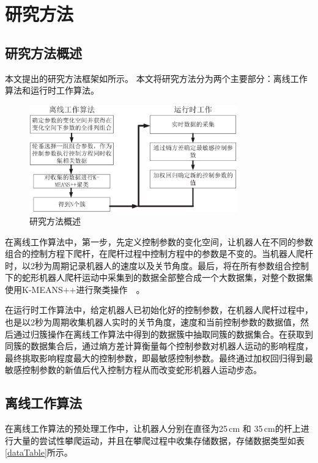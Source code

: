 \chapter{研究方法}
\label{cha:method}

\section{研究方法概述}
本文提出的研究方法框架如所示。 本文将研究方法分为两个主要部分：离线工作算法和运行时工作算法。
\begin{figure}[h]
	\centering
	\includegraphics[width=0.8\textwidth]{figure/chap03/step.eps}
	\caption{研究方法概述}
	\label{fig:stepMap}
\end{figure}

在离线工作算法中，第一步，先定义控制参数的变化空间，让机器人在不同的参数组合的控制方程下爬杆，在爬杆过程中控制方程中的参数是不变的。当机器人爬杆时，以2秒为周期记录机器人的速度以及关节角度。最后，将在所有参数组合控制下的蛇形机器人爬杆运动中采集到的数据全部整合成一个大数据集，对整个数据集使用K-MEANS++进行聚类操作~\cite{Cluseter_ICT}~\cite{KmeansAndDeepLearning}。

在运行时工作算法中，给定机器人已初始化好的控制参数，在机器人爬杆过程中，也是以2秒为周期收集机器人实时的关节角度，速度和当前控制参数的数据值，然后通过归簇操作在离线工作算法中得到的数据簇中抽取同簇的数据集合。在获取到同簇的数据集合后，通过熵方差计算衡量每个控制参数对机器人运动的影响程度，最终挑取影响程度最大的控制参数，即最敏感控制参数。最终通过加权回归得到最敏感控制参数的新值后代入控制方程从而改变蛇形机器人运动步态。

\section{离线工作算法}
在离线工作算法的预处理工作中，让机器人分别在直径为25\,cm 和 35\,cm的杆上进行大量的尝试性攀爬运动，并且在攀爬过程中收集存储数据，存储数据类型如表\,\ref{dataTable}所示。

